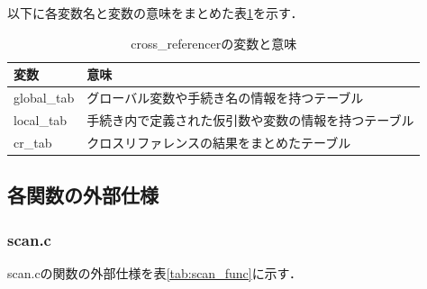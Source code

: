 \documentclass{jlreq}
\begin{document}
以下に各変数名と変数の意味をまとめた表\ref{tab:cross_referencer_design}を示す．
\begin{table}[H]
  \centering
  \caption{cross\_referencerの変数と意味}
  \begin{tabular}{|l|p{10cm}|}
    \hline
    変数        & 意味                                                 \\ \hline
    global\_tab & グローバル変数や手続き名の情報を持つテーブル         \\
    local\_tab  & 手続き内で定義された仮引数や変数の情報を持つテーブル \\
    cr\_tab     & クロスリファレンスの結果をまとめたテーブル           \\ \hline
  \end{tabular}
  \label{tab:cross_referencer_design}
\end{table}

\subsection{各関数の外部仕様}

\subsubsection{scan.c}
scan.cの関数の外部仕様を表\ref{tab:scan_func}に示す．
\end{document}
